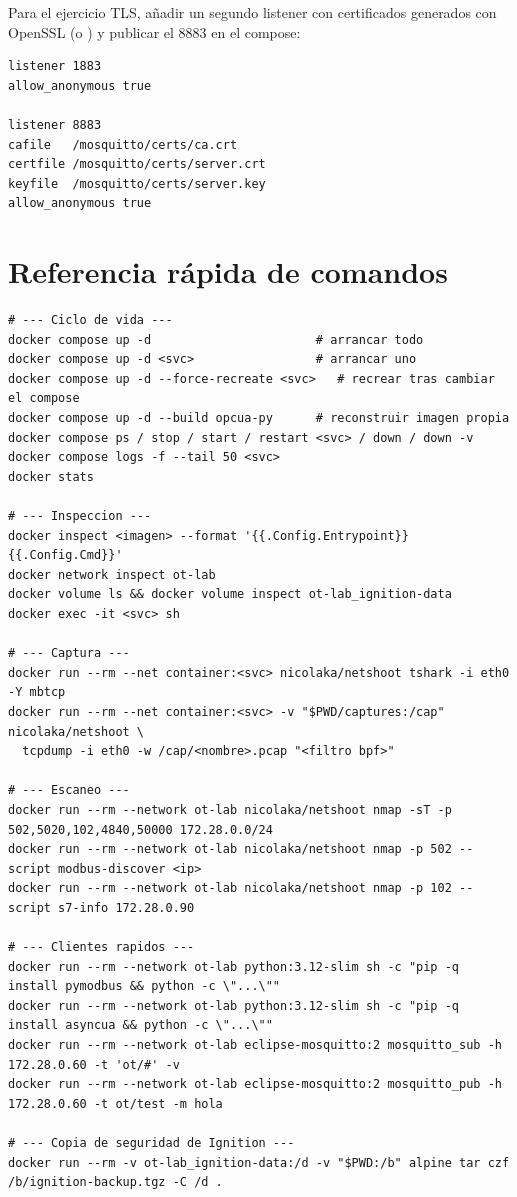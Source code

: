 Para el ejercicio TLS, añadir un segundo listener con certificados generados con OpenSSL (o ) y publicar el 8883 en el compose:

\begin{lstlisting}[style=plain]
listener 1883
allow_anonymous true

listener 8883
cafile   /mosquitto/certs/ca.crt
certfile /mosquitto/certs/server.crt
keyfile  /mosquitto/certs/server.key
allow_anonymous true
\end{lstlisting}

\chapter{Referencia rápida de comandos}
\label{cap:comandos}

\begin{lstlisting}[style=bash]
# --- Ciclo de vida ---
docker compose up -d                       # arrancar todo
docker compose up -d <svc>                 # arrancar uno
docker compose up -d --force-recreate <svc>   # recrear tras cambiar el compose
docker compose up -d --build opcua-py      # reconstruir imagen propia
docker compose ps / stop / start / restart <svc> / down / down -v
docker compose logs -f --tail 50 <svc>
docker stats

# --- Inspeccion ---
docker inspect <imagen> --format '{{.Config.Entrypoint}} {{.Config.Cmd}}'
docker network inspect ot-lab
docker volume ls && docker volume inspect ot-lab_ignition-data
docker exec -it <svc> sh

# --- Captura ---
docker run --rm --net container:<svc> nicolaka/netshoot tshark -i eth0 -Y mbtcp
docker run --rm --net container:<svc> -v "$PWD/captures:/cap" nicolaka/netshoot \
  tcpdump -i eth0 -w /cap/<nombre>.pcap "<filtro bpf>"

# --- Escaneo ---
docker run --rm --network ot-lab nicolaka/netshoot nmap -sT -p 502,5020,102,4840,50000 172.28.0.0/24
docker run --rm --network ot-lab nicolaka/netshoot nmap -p 502 --script modbus-discover <ip>
docker run --rm --network ot-lab nicolaka/netshoot nmap -p 102 --script s7-info 172.28.0.90

# --- Clientes rapidos ---
docker run --rm --network ot-lab python:3.12-slim sh -c "pip -q install pymodbus && python -c \"...\""
docker run --rm --network ot-lab python:3.12-slim sh -c "pip -q install asyncua && python -c \"...\""
docker run --rm --network ot-lab eclipse-mosquitto:2 mosquitto_sub -h 172.28.0.60 -t 'ot/#' -v
docker run --rm --network ot-lab eclipse-mosquitto:2 mosquitto_pub -h 172.28.0.60 -t ot/test -m hola

# --- Copia de seguridad de Ignition ---
docker run --rm -v ot-lab_ignition-data:/d -v "$PWD:/b" alpine tar czf /b/ignition-backup.tgz -C /d .
\end{lstlisting}
